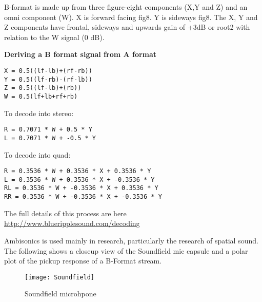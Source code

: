 B-format is made up from three figure-eight components (X,Y and Z) and an omni component (W). X is forward facing fig8. Y is sideways fig8. The X, Y and Z components have frontal, sideways and upwards gain of +3dB or root2 with relation to the W signal (0 dB). 

\textbf{Deriving a B format signal from A format}
\begin{verbatim} 
X = 0.5((lf-lb)+(rf-rb))
Y = 0.5((lf-rb)-(rf-lb))
Z = 0.5((lf-lb)+(rb))
W = 0.5(lf+lb+rf+rb)
\end{verbatim} 

To decode into stereo:
\begin{verbatim} 
R = 0.7071 * W + 0.5 * Y
L = 0.7071 * W + -0.5 * Y
\end{verbatim}

To decode into quad:
\begin{verbatim}
R = 0.3536 * W + 0.3536 * X + 0.3536 * Y
L = 0.3536 * W + 0.3536 * X + -0.3536 * Y
RL = 0.3536 * W + -0.3536 * X + 0.3536 * Y
RR = 0.3536 * W + -0.3536 * X + -0.3536 * Y
\end{verbatim}

The full details of this process are here \url{http://www.blueripplesound.com/decoding}


Ambisonics is used mainly in research, particularly the research of spatial sound. The following shows a closeup view of the Soundfield mic capsule and a polar plot of the pickup response of a B-Format stream.


\begin{figure}[H]
\centering
\texttt{[image: Soundfield]}\caption{Soundfield microhpone}
\label{fig:soundfield}
\end{figure}



\begin{comment}

\begin{figure}[H]
\centering
\texttt{[image: usssinputoutput]}\caption{ussstools input output and sfplay}
\label{fig:usssinputoutput}
\end{figure}

\end{comment}
